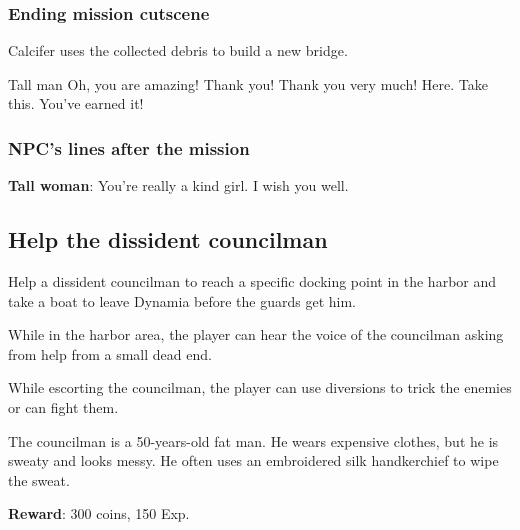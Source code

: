 \subsubsection*{Ending mission cutscene}
\begin{screenplay}

Calcifer uses the collected debris to build a new bridge.

\begin{dialogue}[excited]{Tall man}
Oh, you are amazing! Thank you! Thank you very much! Here. Take this. You've earned it!
\end{dialogue}


\end{screenplay}

\subsubsection*{NPC's lines after the mission}
\textbf{Tall woman}: You're really a kind girl. I wish you well.



\subsection{Help the dissident councilman}
Help a dissident councilman to reach a specific docking point in the harbor and take a boat to leave Dynamia before the guards get him.

While in the harbor area, the player can hear the voice of the councilman asking from help from a small dead end.

While escorting the councilman, the player can use diversions to trick the enemies or can fight them.

The councilman is a 50-years-old fat man. He wears expensive clothes, but he is sweaty and looks messy. He often uses an embroidered silk handkerchief to wipe the sweat.

\textbf{Reward}: 300 coins, 150 Exp.

